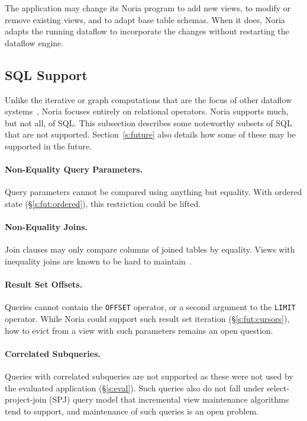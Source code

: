 The application may change its Noria program to add new views, to modify or
remove existing views, and to adapt base table schemas. When it does, Noria
adapts the running dataflow to incorporate the changes without restarting the
dataflow engine.

\subsection{SQL Support}

Unlike the iterative or graph computations that are the focus of other dataflow
systems~\cite{naiad, differential-dataflow}, Noria focuses entirely on
relational operators. Noria supports much, but not all, of SQL. This subsection
describes some noteworthy subsets of SQL that are not supported.
Section~\ref{s:future} also details how some of these may be supported in the
future.

\paragraph{Non-Equality Query Parameters.}
Query parameters cannot be compared using anything but equality. With ordered
state (\S\ref{s:fut:ordered}), this restriction could be lifted.

\paragraph{Non-Equality Joins.}
Join clauses may only compare columns of joined tables by equality. Views with
inequality joins are known to be hard to maintain~\cite{inequality-incremental}.

\paragraph{Result Set Offsets.}
Queries cannot contain the \texttt{OFFSET} operator, or a second argument to the
\texttt{LIMIT} operator. While Noria could support such result set iteration
(\S\ref{s:fut:cursors}), how to evict from a view with such parameters remains
an open question.

\paragraph{Correlated Subqueries.}
Queries with correlated subqueries are not supported as these were not used by
the evaluated application (\S\ref{s:eval}). Such queries also do not fall under
select-project-join (SPJ) query model that incremental view maintenance
algorithms tend to support, and maintenance of such queries is an open problem.

